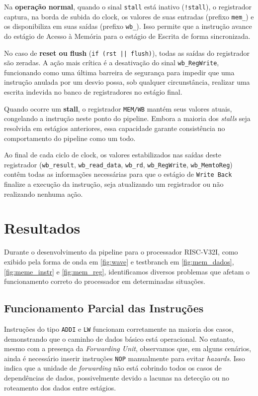 \documentclass[12pt]{article}
\begin{document}
Na \textbf{operação normal}, quando o sinal \texttt{stall} está inativo (\texttt{!stall}), 
o registrador captura, na borda de subida do clock, os valores de suas entradas 
(prefixo \texttt{mem\_}) e os disponibiliza em suas saídas (prefixo \texttt{wb\_}). 
Isso permite que a instrução avance do estágio de Acesso à Memória para o estágio de Escrita 
de forma sincronizada.

No caso de \textbf{reset ou flush} (\texttt{if (rst || flush)}), todas as saídas do registrador 
são zeradas. A ação mais crítica é a desativação do sinal \texttt{wb\_RegWrite}, funcionando 
como uma última barreira de segurança para impedir que uma instrução anulada por um desvio 
possa, sob qualquer circunstância, realizar uma escrita indevida no banco de registradores 
no estágio final.

Quando ocorre um \textbf{stall}, o registrador \texttt{MEM/WB} mantém seus valores atuais, 
congelando a instrução neste ponto do pipeline. Embora a maioria dos \textit{stalls} seja 
resolvida em estágios anteriores, essa capacidade garante consistência no comportamento 
do pipeline como um todo.

Ao final de cada ciclo de clock, os valores estabilizados nas saídas deste registrador 
(\texttt{wb\_result}, \texttt{wb\_read\_data}, \texttt{wb\_rd}, \texttt{wb\_RegWrite}, 
\texttt{wb\_MemtoReg}) contêm todas as informações necessárias para que o estágio de 
\texttt{Write Back} finalize a execução da instrução, seja atualizando um registrador ou 
não realizando nenhuma ação.

\section{Resultados}

Durante o desenvolvimento da pipeline para o processador RISC-V32I, como exibido pela forma de onda  em \ref{fig:wave} e testbranch em \ref{fig:mem_dados}, \ref{fig:meme_instr} e \ref{fig:mem_reg}, identificamos diversos problemas que afetam o funcionamento correto do processador em determinadas situações.  

\subsection{Funcionamento Parcial das Instruções}
Instruções do tipo \texttt{ADDI} e \texttt{LW} funcionam corretamente na maioria dos casos, demonstrando que o caminho de dados básico está operacional. No entanto, mesmo com a presença da \textit{Forwarding Unit}, observamos que, em alguns cenários, ainda é necessário inserir instruções \texttt{NOP} manualmente para evitar \textit{hazards}. Isso indica que a unidade de \textit{forwarding} não está cobrindo todos os casos de dependências de dados, possivelmente devido a lacunas na detecção ou no roteamento dos dados entre estágios.
\end{document}
